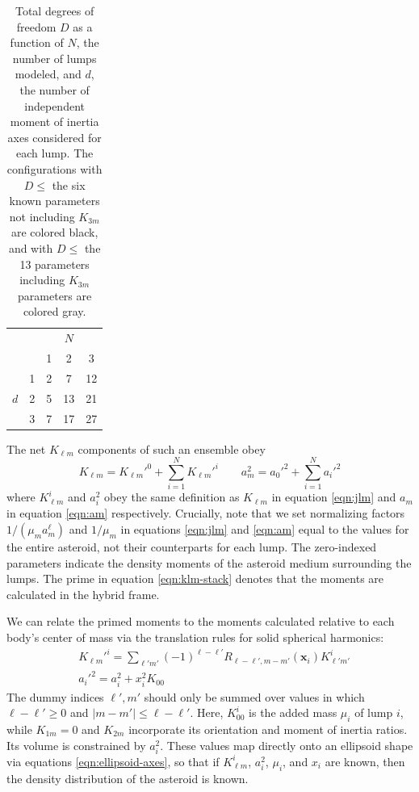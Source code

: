 \documentclass[fleqn,usenatbib]{mnras}
\begin{document}
\begin{table}
  \centering
  \begin{tabular}{cc|ccc}
    \hline \hline
        &  & & $N$ &  \\
        &  & 1  & 2  & 3  \\ \hline 
        & 1& \cellcolor{black}\color{white} 2 & \cellcolor{gray}\color{white} 7 & \cellcolor{gray}\color{white} 12\\
    $d$ & 2& \cellcolor{black}\color{white} 5 & \cellcolor{gray}\color{white} 13 & 21 \\
        & 3& \cellcolor{gray}\color{white}  7 &  17 &  27 \\
    \hline \hline
  \end{tabular}
  \caption{Total degrees of freedom $D$ as a function of $N$, the number of lumps modeled, and $d$, the number of independent moment of inertia axes considered for each lump. The configurations with $D \leq$ the six known parameters not including $K_{3m}$ are colored black, and with $D \leq$ the 13 parameters including $K_{3m}$ parameters are colored gray.}
  \label{tab:lump-dof}
\end{table}

The net $K_{\ell m}$ components of such an ensemble obey
\begin{equation}
  K_{\ell m} = K_{\ell m}'^0 + \sum_{i=1}^N K_{\ell m}'^i \qquad a_m^2 = a_0'^2 + \sum_{i=1}^N a_i'^2
  \label{eqn:klm-stack}
\end{equation}
where $K_{\ell m}^i$ and $a_i^2$ obey the same definition as $K_{\ell m}$ in equation \ref{eqn:jlm} and $a_m$ in equation \ref{eqn:am} respectively. Crucially, note that we set normalizing factors $1/(\mu_m a_m^\ell)$ and $1/\mu_m$ in equations \ref{eqn:jlm} and \ref{eqn:am} equal to the values for the entire asteroid, not their counterparts for each lump. The zero-indexed parameters indicate the density moments of the asteroid medium surrounding the lumps. The prime in equation \ref{eqn:klm-stack} denotes that the moments are calculated in the hybrid frame.

We can relate the primed moments to the moments calculated relative to each body's center of mass via the translation rules for solid spherical harmonics:
\begin{equation}
  \begin{split}
  & K_{\ell m}'^i = \sum_{\ell' m'} (-1)^{\ell - \ell'} R_{\ell - \ell', m - m'}(\bm x_i) K_{\ell' m'}^i\\
  & a_i'^2 = a_i^2 + x_i^2 K_{00}
  \end{split}
  \label{eqn:translate-klm}
\end{equation}
The dummy indices $\ell', m'$ should only be summed over values in which $\ell-\ell' \geq 0$ and $|m-m'| \leq \ell - \ell'$. Here, $K_{00}^i$ is the added mass $\mu_i$ of lump $i$, while $K_{1m}=0$ and $K_{2m}$ incorporate its orientation and moment of inertia ratios. Its volume is constrained by $a_i^2$. These values map directly onto an ellipsoid shape via equations \ref{eqn:ellipsoid-axes}, so that if $K_{\ell m}^i$, $a_i^2$, $\mu_i$, and $x_i$ are known, then the density distribution of the asteroid is known.
\end{document}
